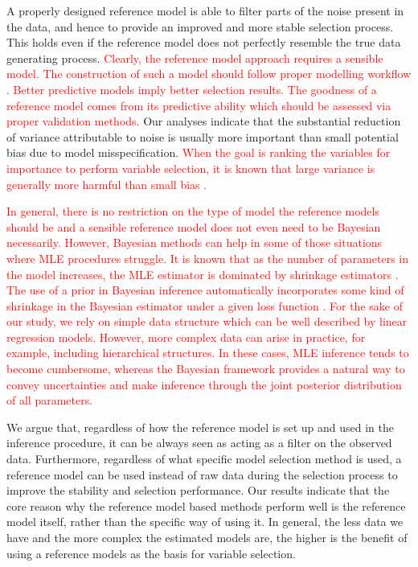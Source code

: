 \documentclass[a4]{article}
\theoremstyle{definition}
\newcommand{\fede}[1]{\textcolor{red}{#1}}
\begin{document}
A properly designed reference model is able to filter parts of the
noise present in the data, and hence to provide an improved and more
stable selection process. This holds even if the reference model does
not perfectly resemble the true data generating process. 
\fede{Clearly, the reference model approach requires a sensible model. 
The construction of such a model should follow proper modelling workflow \citep[see, e.g.][]{gelman2020bayesian}. Better predictive models imply better selection results. 
The goodness of a reference model comes from its predictive ability which should be 
assessed via proper validation methods.} Our analyses indicate that the substantial 
reduction of variance attributable to noise is usually more important than small potential
bias due to model misspecification.
\fede{When the goal is ranking the variables for importance to
perform variable selection, it is known that large variance is
generally more harmful than small bias \citep{piironen2017comparison}.}

\fede{In general, there is no restriction on the type of model the reference models should be and a sensible reference model does not even need to be Bayesian necessarily.
However, Bayesian methods can help in some of those situations
where MLE procedures struggle. 
It is known that as the number of parameters in the model increases, the MLE
estimator is dominated by shrinkage estimators 
\citep{stein1956inadmissibility, stein1961estimation, parmigiani2009decision, efron2011tweedie}.
The use of a prior in Bayesian inference automatically incorporates 
some kind of shrinkage in the Bayesian estimator under a given loss function \citep[see, e.g.][]{rockova2012hierarchical}. 
For the sake of our study, we rely on simple data structure which can be well described 
by linear regression models. However, more complex data can arise in practice, for example, including hierarchical structures. In these cases, MLE inference tends to become cumbersome, whereas the Bayesian framework provides a natural way to convey uncertainties and make inference through the joint posterior distribution of all parameters.}

We argue that, regardless of how
the reference model is set up and used in the inference procedure, it
can be always seen as acting as a filter on the observed
data. Furthermore, regardless of what specific model selection method
is used, a reference model can be used instead of raw data during the
selection process to improve the stability and selection
performance. Our results indicate that the core reason why the
reference model based methods perform well is the reference model
itself, rather than the specific way of using it.  In general, the
less data we have and the more complex the estimated models are, the
higher is the benefit of using a reference models as the basis for
variable selection.
\end{document}
